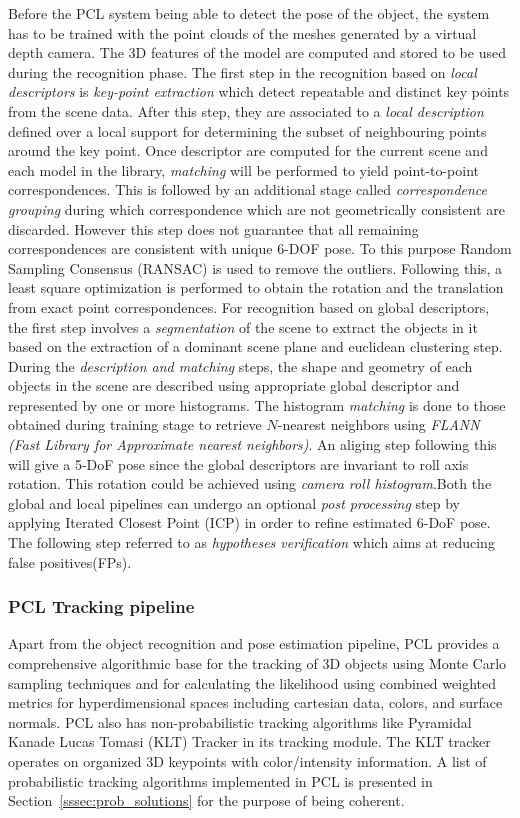 Before the PCL system being able to detect the pose of the object, the system has to be trained with the point clouds of the meshes generated by a virtual depth camera. The 3D features of the model are computed and stored to be used during the recognition phase. The first step in the recognition based on \emph{local descriptors} is \emph{key-point extraction} which detect repeatable and distinct key points from the scene data. After this step, they are associated to a \emph{local description} defined over a local support for determining the subset of neighbouring points around the key point. Once descriptor are computed for the current scene and each model in the library, \emph{matching} will be performed to yield point-to-point correspondences. This is followed by an additional stage called \emph{correspondence grouping} during which correspondence which are not geometrically consistent are discarded. However this step does not guarantee that all remaining correspondences are consistent with unique 6-DOF pose. To this purpose Random Sampling Consensus (RANSAC) is used to remove the outliers. Following this, a least square optimization is performed to obtain the rotation and the translation from exact point correspondences. For recognition based on global descriptors, the first step involves a \emph{segmentation} of the scene to extract the objects in it based on the extraction of a dominant scene plane and euclidean clustering step. During the \emph{description and matching} steps, the shape and geometry of each objects in the scene are described using appropriate global descriptor and represented by one or more histograms. The histogram \emph{matching} is done to those obtained during training stage to retrieve $N$-nearest neighbors using \emph{FLANN (Fast Library for Approximate nearest neighbors)}. An aliging step following this will give a 5-DoF pose since the global descriptors are invariant to roll axis rotation. This rotation could be achieved using \emph{camera roll histogram}.Both the global and local pipelines can undergo an optional \emph{post processing} step by applying Iterated Closest Point (ICP) in order to refine estimated 6-DoF pose. The following step referred to as \emph{hypotheses verification} which aims at reducing false positives(FPs).
\subsubsection{PCL Tracking pipeline}
Apart from the object recognition and pose estimation pipeline, PCL provides a comprehensive algorithmic base for the tracking of 3D objects using Monte Carlo sampling techniques \cite{RUeda2012} and for calculating the likelihood using combined weighted metrics for hyperdimensional spaces including cartesian data, colors, and surface normals. PCL also has non-probabilistic tracking algorithms like Pyramidal Kanade Lucas Tomasi (KLT) Tracker in its tracking module. The KLT tracker operates on organized 3D keypoints with color/intensity information. A list of probabilistic tracking algorithms implemented in PCL is presented in Section~\ref{sssec:prob_solutions} for the purpose of being coherent.
